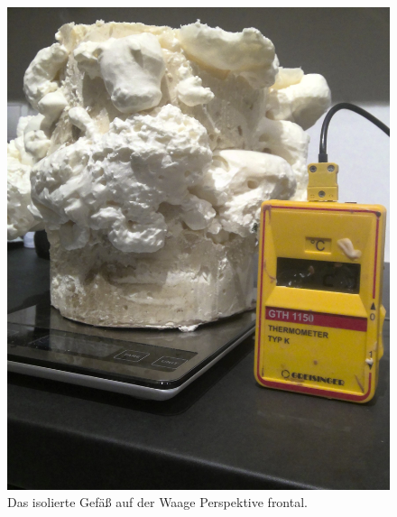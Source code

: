\documentclass[11pt, ngerman]{scrartcl}
\begin{document}
\begin{figure}[H]
\begin{minipage}[t]{.33\linewidth}
		\includegraphics[width=\linewidth]{pics/Aufbau (2).jpg}
		\caption[Aufbau isoliertes Gefäß auf der Waage (Frontal)]{Das isolierte Gefäß
			auf der Waage Perspektive frontal.}
		\label{fig:waageaufbau2}
	\end{minipage}
	\begin{minipage}[t]{.30\linewidth} %

\end{minipage}
\end{figure}
\end{document}
